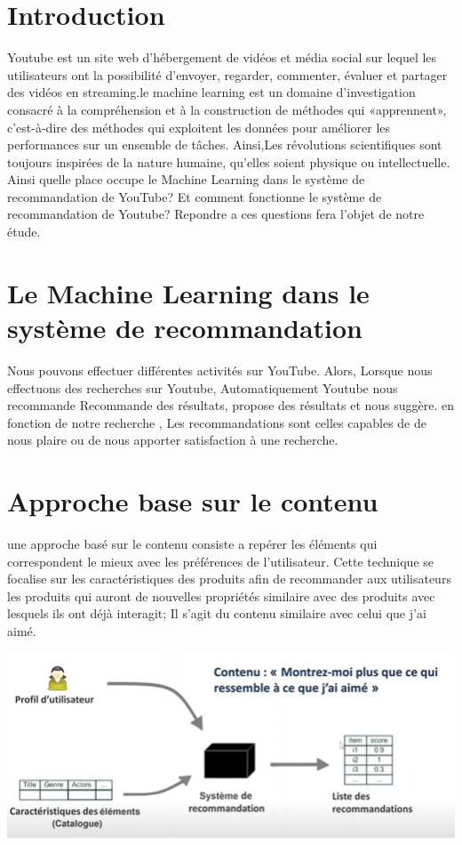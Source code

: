 \documentclass[12pt,a4paper]{article}
\begin{document}
\begin{figure}

\end{figure}
\section*{Introduction}
  Youtube  est un site web d'hébergement de vidéos et média social sur lequel les utilisateurs ont la possibilité d'envoyer, regarder, 
commenter, évaluer et partager des vidéos en streaming.le machine learning est un domaine d'investigation consacré à la compréhension et 
à la construction de méthodes qui
 «apprennent», c'est-à-dire des méthodes qui exploitent les données pour améliorer les performances sur un ensemble de tâches. Ainsi,Les 
révolutions scientifiques sont toujours inspirées de la nature humaine, qu'elles soient physique ou intellectuelle. Ainsi 
quelle place occupe le Machine Learning dans le système de recommandation de YouTube? Et comment fonctionne le système de recommandation
 de Youtube? Repondre a ces questions fera l'objet de notre étude. 
 
\section{Le Machine Learning dans le système de recommandation}
 Nous pouvons effectuer différentes activités sur YouTube. Alors, Lorsque nous effectuons des recherches sur Youtube, Automatiquement Youtube nous recommande  Recommande des résultats, propose des résultats et nous  suggère. en fonction de notre recherche , Les recommandations sont celles capables de de nous plaire ou de nous apporter satisfaction à une recherche.

 
\section{Approche base sur le contenu}	
 une approche basé sur le contenu consiste a repérer les éléments qui correspondent le mieux avec les préférences de l'utilisateur. Cette technique se focalise sur les caractéristiques des produits afin de recommander aux utilisateurs les produits qui auront de nouvelles propriétés 
similaire avec des produits avec lesquels ils ont déjà interagit; Il s'agit du contenu similaire avec celui que j'ai aimé.


\includegraphics[width=2\linewidth]{Capture 1}
\end{document}
